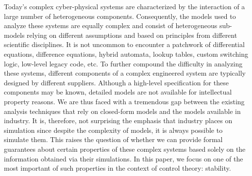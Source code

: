 Today's complex cyber-physical systems are characterized by the interaction of a large number of heterogeneous components. Consequently, the models used to analyze these systems are equally complex and consist of heterogeneous sub-models relying on different assumptions and based on principles from different scientific disciplines. It is not uncommon to encounter a patchwork of differential equations, difference equations, hybrid automata, lookup tables, custom switching logic, low-level legacy code, etc. To further compound the difficulty in analyzing these systems, different components of a complex engineered system are typically designed by different suppliers. Although a high-level specification for these components may be known, detailed models are not available for intellectual property reasons. We are thus faced with a tremendous gap between the existing analysis techniques that rely on closed-form models and the models available in industry. It is, therefore, not surprising the emphasis that industry places on simulation since despite the complexity of models, it is always possible to simulate them. This raises the question of whether we can provide formal guarantees about certain properties of these complex systems based solely on the information obtained via their simulations. In this paper, we focus on one of the most important of such properties in the context of control theory: stability.


